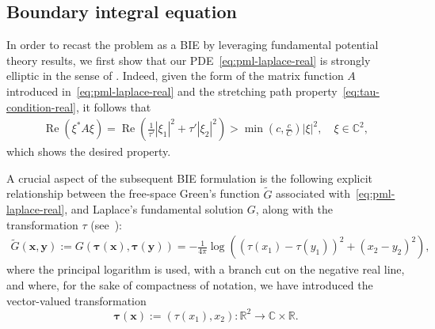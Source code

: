 \documentclass[review,hidelinks,onefignum,onetabnum]{siamart220329}
\newcommand{\R}{\mathbb{R}}
\newcommand{\C}{\mathbb{C}}
\newcommand{\bx}{\mathbf{x}}
\newcommand{\btau}{\boldsymbol{\tau}}
\newcommand{\by}{\mathbf{y}}
\newcommand{\real}{\operatorname{Re}}
\begin{document}
\subsection{Boundary integral equation}\label{sec:complex-scaled-bie}
In order to recast the problem as a BIE by leveraging fundamental potential theory results, we first show that our PDE~\cref{eq:pml-laplace-real} is strongly elliptic in the sense of \cite{mclean2000strongly}. Indeed, given the form of the matrix function $A$ introduced in~\cref{eq:pml-laplace-real} and the stretching path property~\cref{eq:tau-condition-real}, it follows that
\begin{align}
    \real(\xi^* A \xi) = \real\left( \frac{1}{\tau'} |\xi_1|^2 + \tau' |\xi_2|^2 \right) > \min\left(c,\frac{c}{C}\right) |\xi|^2,\quad \xi \in \C^2,
\end{align}
which shows the desired property. 


A crucial aspect of the subsequent BIE formulation is the following explicit relationship between the free-space Green's function $\widetilde{G}$ associated with~\cref{eq:pml-laplace-real}, and Laplace's fundamental solution $G$, along with the transformation $\tau$ (see~):
\begin{align}
  \label{eq:complex-Green-function}
\widetilde{G}(\bx,\by) := G(\btau(\bx),\btau(\by)) = -\frac{1}{4\pi}\log \left( (\tau(x_1) - \tau(y_1))^2 + (x_2 - y_2)^2 \right),
\end{align}
where the principal logarithm is used, with a branch cut on the negative real line, and where, for the sake of compactness of notation, we have introduced the vector-valued transformation 
$$\btau(\bx) := (\tau(x_1),x_2) : \R^2 \to \C \times \R.$$ %
\end{document}

